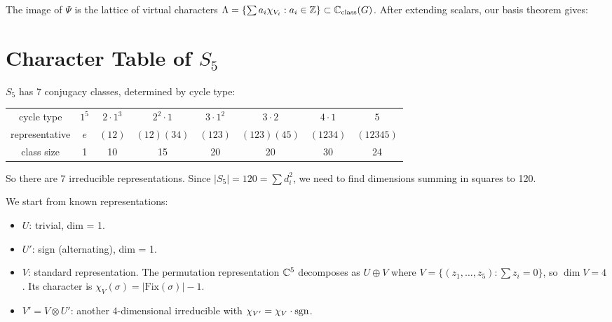 \documentclass{report}
\begin{document}
The image of \(\Psi\) is the lattice of virtual characters \(\Lambda = \{\sum a_i \chi_{V_i} : a_i \in \ZZ\} \subset \CC_{\mathrm{class}}(G)\). After extending scalars, our basis theorem gives:




\section{Character Table of \(S_5\)}

\(S_5\) has 7 conjugacy classes, determined by cycle type:

\begin{center}
\begin{tabular}{c|ccccccc}
cycle type & \(1^5\) & \(2 \cdot 1^3\) & \(2^2 \cdot 1\) & \(3 \cdot 1^2\) & \(3 \cdot 2\) & \(4 \cdot 1\) & \(5\) \\
representative & \(e\) & \((12)\) & \((12)(34)\) & \((123)\) & \((123)(45)\) & \((1234)\) & \((12345)\) \\
class size & 1 & 10 & 15 & 20 & 20 & 30 & 24
\end{tabular}
\end{center}

So there are 7 irreducible representations. Since \(|S_5| = 120 = \sum d_i^2\), we need to find dimensions summing in squares to 120.

We start from known representations:
\begin{itemize}
    \item \(U\): trivial, dim = 1.
    \item \(U'\): sign (alternating), dim = 1.
    \item \(V\): standard representation. The permutation representation \(\CC^5\) decomposes as \(U \oplus V\) where \(V = \{(z_1, \ldots, z_5) : \sum z_i = 0\}\), so \(\dim V = 4\). Its character is \(\chi_V(\sigma) = |\text{Fix}(\sigma)| - 1\).
    \item \(V' = V \otimes U'\): another 4-dimensional irreducible with \(\chi_{V'} = \chi_V \cdot \operatorname{sgn}\).
\end{itemize}
\end{document}
